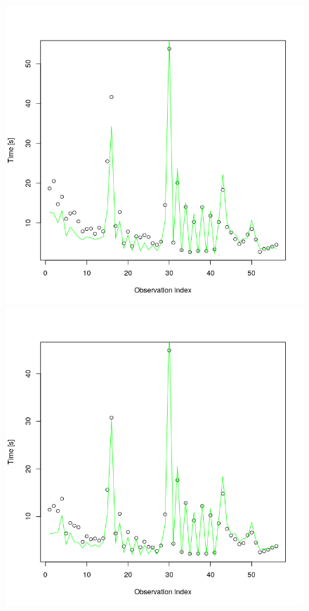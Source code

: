 \begin{figure}[htb]
\centering
\begin{minipage}{0.3\textwidth}
\includegraphics[width=\textwidth]{figures/tfeti-none.png}
\end{minipage}
\begin{minipage}{0.3\textwidth}
\includegraphics[width=\textwidth]{figures/tfeti-lumped.png}

\end{minipage}
\end{figure}

